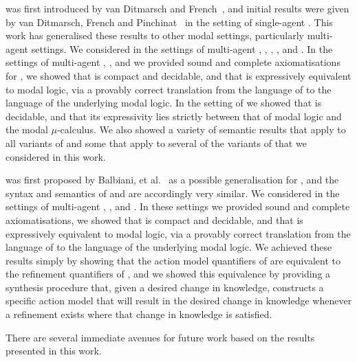 \logicRml{} was first introduced by van Ditmarsch and French~\cite{vanditmarsch:2009}, and initial results were given by van Ditmarsch, French and Pinchinat~\cite{vanditmarsch:2010} in the setting of single-agent \classK{}.
This work has generalised these results to other modal settings, particularly multi-agent settings.
We considered \logicRml{} in the settings of multi-agent \classK{}, \classKF{}, \classKFF{}, \classKD{}, and \classS{}.
In the settings of multi-agent \classK{}, \classKFF{}, \classKD{} and \classS{} we provided sound and complete axiomatisations for \logicRml{}, we showed that \logicRml{} is compact and decidable, and that \logicRml{} is expressively equivalent to modal logic, via a provably correct translation from the language of \logicRml{} to the language of the underlying modal logic.
In the setting of \classKF{} we showed that \logicRml{} is decidable, and that its expressivity lies strictly between that of modal logic and the modal $\mu$-calculus.
We also showed a variety of semantic results that apply to all variants of \logicRml{} and some that apply to several of the variants of \logicRml{} that we considered in this work.

\logicAaml{} was first proposed by Balbiani, et al.~\cite{balbiani:2007} as a possible generalisation for \logicApal{}, and the syntax and semantics of \logicAaml{} and \logicApal{} are accordingly very similar.
We considered \logicAaml{} in the settings of multi-agent \classK{}, \classKFF{}, and \classS{}.
In these settings we provided sound and complete axiomatisations, we showed that \logicAaml{} is compact and decidable, and that \logicAaml{} is expressively equivalent to modal logic, via a provably correct translation from the language of \logicAaml{} to the language of the underlying modal logic.
We achieved these results simply by showing that the action model quantifiers of \logicAaml{} are equivalent to the refinement quantifiers of \logicRml{}, and we 
showed this equivalence by providing a synthesis procedure that, given a desired change in knowledge, constructs a specific action model that will result in the desired change in knowledge whenever a refinement exists where that change in knowledge is satisfied.

There are several immediate avenues for future work based on the results presented in this work.

